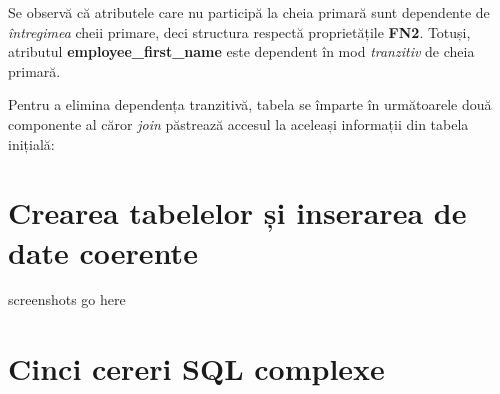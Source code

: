 \documentclass[a4paper, oneside, 12pt]{article}
\newcommand{\rowstyle}[1]{\gdef\currentrowstyle{#1}%
  #1\ignorespaces
}
\begin{document}
Se observă că atributele care nu participă la cheia primară sunt dependente de
\emph{întregimea} cheii primare, deci structura respectă proprietățile \textbf{FN2}.
Totuși, atributul \textbf{employee\_first\_name} este dependent în mod
\emph{tranzitiv} de cheia primară.

Pentru a elimina dependența tranzitivă, tabela se împarte în următoarele două
componente al căror \emph{join} păstrează accesul la aceleași informații din
tabela inițială:

\begin{table}[H]
\centering
\caption*{Tabela \textbf{SUBSCRIPTION\_1}:}
\end{table}

\begin{table}[H]
\centering
\caption*{Tabela \textbf{SUBSCRIPTION\_2}:}
\end{table}

\section{Crearea tabelelor și inserarea de date coerente}

screenshots go here

\section{Cinci cereri SQL complexe}
\end{document}
